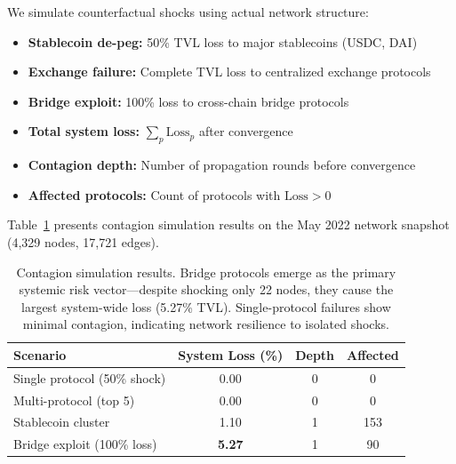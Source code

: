 \documentclass[preprint,12pt]{elsarticle}
\renewcommand{\paragraph}[1]{}
\begin{document}
\paragraph{Simulation scenarios.}
We simulate counterfactual shocks using actual network structure:
\begin{itemize}
  \item \textbf{Stablecoin de-peg:} 50\% TVL loss to major stablecoins (USDC, DAI)
  \item \textbf{Exchange failure:} Complete TVL loss to centralized exchange protocols
  \item \textbf{Bridge exploit:} 100\% loss to cross-chain bridge protocols
\end{itemize}

\paragraph{Metrics.}
\begin{itemize}
  \item \textbf{Total system loss:} $\sum_p \text{Loss}_p$ after convergence
  \item \textbf{Contagion depth:} Number of propagation rounds before convergence
  \item \textbf{Affected protocols:} Count of protocols with $\text{Loss} > 0$
\end{itemize}

Table~\ref{tab:contagion-results} presents contagion simulation results on the May 2022 network snapshot (4,329 nodes, 17,721 edges).

\begin{table}[t]
\centering
\small
\begin{tabular}{lccc}
\hline
\textbf{Scenario} & \textbf{System Loss (\%)} & \textbf{Depth} & \textbf{Affected} \\
\hline
Single protocol (50\% shock) & 0.00 & 0 & 0 \\
Multi-protocol (top 5) & 0.00 & 0 & 0 \\
Stablecoin cluster & 1.10 & 1 & 153 \\
Bridge exploit (100\% loss) & \textbf{5.27} & 1 & 90 \\
\hline
\end{tabular}
\caption{Contagion simulation results. Bridge protocols emerge as the primary systemic risk vector---despite shocking only 22 nodes, they cause the largest system-wide loss (5.27\% TVL). Single-protocol failures show minimal contagion, indicating network resilience to isolated shocks.}
\label{tab:contagion-results}
\end{table}
\end{document}
